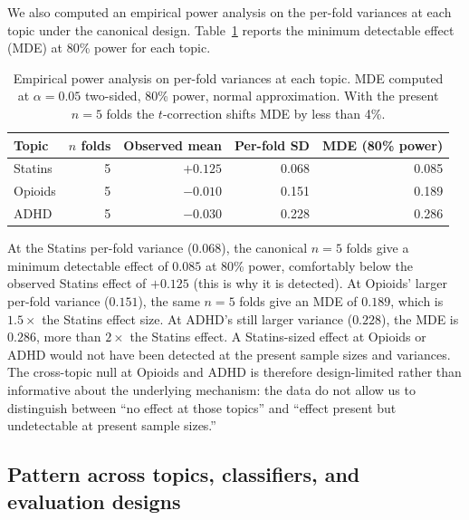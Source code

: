 \documentclass[11pt,a4paper]{article}
\begin{document}
We also computed an empirical power analysis on the per-fold variances at each topic under the canonical design. Table~\ref{tab:power} reports the minimum detectable effect (MDE) at 80\% power for each topic.

\begin{table}[h]
\centering
\small
\begin{tabular}{lrrrr}
\toprule
Topic & $n$ folds & Observed mean & Per-fold SD & MDE (80\% power) \\
\midrule
Statins & 5  & $+0.125$ & 0.068 & 0.085 \\
Opioids & 5  & $-0.010$ & 0.151 & 0.189 \\
ADHD    & 5  & $-0.030$ & 0.228 & 0.286 \\
\bottomrule
\end{tabular}
\caption{Empirical power analysis on per-fold variances at each topic. MDE computed at $\alpha = 0.05$ two-sided, 80\% power, normal approximation. With the present $n = 5$ folds the $t$-correction shifts MDE by less than 4\%.}
\label{tab:power}
\end{table}

At the Statins per-fold variance ($0.068$), the canonical $n = 5$ folds give a minimum detectable effect of $0.085$ at 80\% power, comfortably below the observed Statins effect of $+0.125$ (this is why it is detected). At Opioids' larger per-fold variance ($0.151$), the same $n = 5$ folds give an MDE of $0.189$, which is $1.5\times$ the Statins effect size. At ADHD's still larger variance ($0.228$), the MDE is $0.286$, more than $2\times$ the Statins effect. A Statins-sized effect at Opioids or ADHD would not have been detected at the present sample sizes and variances. The cross-topic null at Opioids and ADHD is therefore design-limited rather than informative about the underlying mechanism: the data do not allow us to distinguish between ``no effect at those topics'' and ``effect present but undetectable at present sample sizes.''

\subsection{Pattern across topics, classifiers, and evaluation designs}
\end{document}
